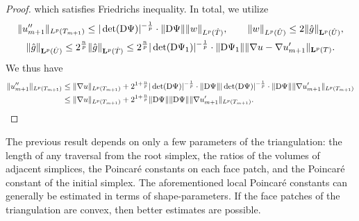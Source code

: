 \documentclass[a4paper]{article}
\begin{document}
\begin{proof}
    which satisfies Friedrichs inequality. In total, we utilize 
    \begin{gather*}
        \| u''_{m+1} \|_{L^{p}(T_{m+1})}
        \leq 
        |\det({\mathrm D} \Psi)|^{-\frac 1 p} \cdot \| {\mathrm D} \Psi \|
        \| w \|_{L^{p}(\hat T)}
        ,
        \qquad 
        \| w \|_{L^{p}(\hat U)} 
        \leq 
        2 
        \| \hat g \|_{{\mathbf L}^{p}(\hat U)}
        ,
        \\
        \| \hat g \|_{{\mathbf L}^{p}(\hat U)}
        \leq 
        2^{\frac n p}
        \| \hat g \|_{{\mathbf L}^{p}(\hat T)}
        \leq 
        2^{\frac n p}
        |\det({\mathrm D} \Psi_1)|^{-\frac 1 p} \cdot \| {\mathrm D} \Psi_1 \|
        \| \nabla u - \nabla u'_{m+1} \|_{{\mathbf L}^{p}(T)}
        .
    \end{gather*}
    We thus have
    \begin{align*}
        \| u''_{m+1} \|_{L^{p}(T_{m+1})}
        &
        \leq 
        \| \nabla u \|_{L^{p}(T_{m+1})} 
        + 
        2^{1+\frac n p}
        |\det({\mathrm D} \Psi)|^{-\frac 1 p} \cdot \| {\mathrm D} \Psi \|
        |\det({\mathrm D} \Psi)|^{-\frac 1 p} \cdot \| {\mathrm D} \Psi \|
        \| \nabla u'_{m+1} \|_{L^{p}(T_{m+1})}
        \\&
        \leq 
        \| \nabla u \|_{L^{p}(T_{m+1})} 
        + 
        2^{1+\frac n p}
        \| {\mathrm D} \Psi \|
        \| {\mathrm D} \Psi \|
        \| \nabla u'_{m+1} \|_{L^{p}(T_{m+1})}
        .
    \end{align*}
    
\end{proof}

\begin{remark}
    The previous result depends on only a few parameters of the triangulation:
    the length of any traversal from the root simplex,
    the ratios of the volumes of adjacent simplices,
    the Poincar\'e constants on each face patch, and the Poincar\'e constant of the initial simplex. 
    The aforementioned local Poincar\'e constants can generally be estimated in terms of shape-parameters. 
    If the face patches of the triangulation are convex, then better estimates are possible. 
\end{remark}

\end{document}
